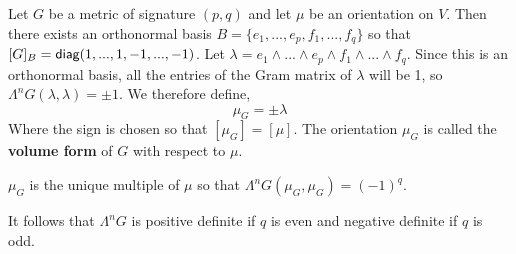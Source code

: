\begin{defn}
    Let $G$ be a metric of signature $(p,q)$ and let $\mu$ be an orientation on $V$. Then there exists an orthonormal basis $B=\{e_1,...,e_p,f_1,...,f_q\}$ so that $[G]_B = \operatorname{\textsf{diag}} (1,...,1,-1,...,-1)$. Let $\lambda = e_1\wedge...\wedge e_p \wedge f_1\wedge ... \wedge f_q$. Since this is an orthonormal basis, all the entries of the Gram matrix of $\lambda$ will be 1, so $\Lambda^n G(\lambda,\lambda) = \pm 1$. We therefore define,
    \begin{equation}
        \mu_G = \pm\lambda 
    \end{equation}
    Where the sign is chosen so that $[\mu_G] = [\mu]$. The orientation $\mu_G$ is called the \textbf{volume form} of $G$ with respect to $\mu$.
\end{defn}
\begin{remark*}
    $\mu_G$ is the unique multiple of $\mu$ so that $\Lambda^n G(\mu_G,\mu_G) = (-1)^q$.
\end{remark*}
\begin{remark*}
    It follows that $\Lambda^n G$ is positive definite if $q$ is even and negative definite if $q$ is odd.
\end{remark*}

